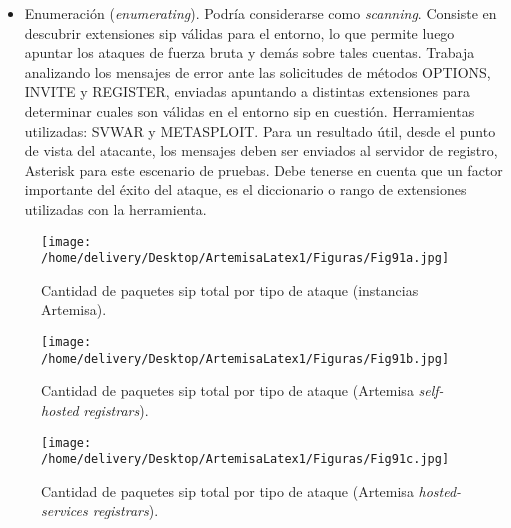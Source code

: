\documentclass[a4paper,12pt]{report}
\begin{document}
{\begin{itemize}
\item Enumeración (\emph{enumerating}).
   Podría considerarse como \emph{scanning}. Consiste en descubrir extensiones
\ac{sip} válidas para el entorno, lo que permite luego apuntar los ataques de fuerza
bruta y demás sobre tales cuentas. Trabaja analizando los
mensajes de error ante las solicitudes de métodos OPTIONS, INVITE y REGISTER,
enviadas apuntando a distintas extensiones para determinar cuales son válidas en
el entorno \ac{sip} en cuestión. Herramientas utilizadas: SVWAR y METASPLOIT.
    Para un resultado útil, desde el punto de vista del atacante, los mensajes
deben ser enviados al servidor de registro, Asterisk para este escenario de
pruebas. Debe tenerse en cuenta que un factor importante del éxito del
ataque, es el diccionario o rango de extensiones utilizadas con la
herramienta.

\end{itemize}

\begin{figure}[h!] 
\centering
\texttt{[image: /home/delivery/Desktop/ArtemisaLatex1/Figuras/Fig91a.jpg]}
\caption{Cantidad de paquetes \ac{sip} total por tipo de ataque (instancias Artemisa).}
\label{ataques_artemisa}
\end{figure}

\begin{figure}[h!] 
\centering
\texttt{[image: /home/delivery/Desktop/ArtemisaLatex1/Figuras/Fig91b.jpg]}
\caption{Cantidad de paquetes \ac{sip} total por tipo de ataque
(Artemisa \emph{self-hosted} \emph{registrars}).}
\label{ataques_artemisa_sh}
\end{figure}

\begin{figure}[h!] 
\centering
\texttt{[image: /home/delivery/Desktop/ArtemisaLatex1/Figuras/Fig91c.jpg]}
\caption{Cantidad de paquetes \ac{sip} total por tipo de ataque (Artemisa
\emph{hosted-services registrars}).}
\label{ataques_artemisa_hs}
\end{figure}


\begin{figure}[h!]
 \centering
\end{figure}}
\end{document}
